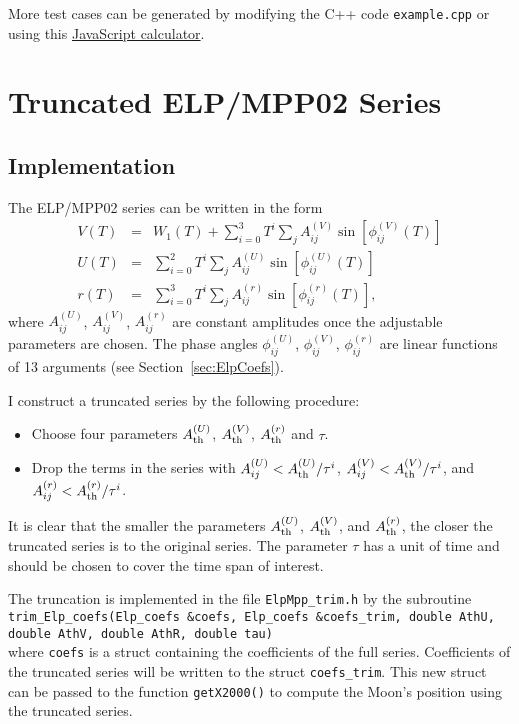 \documentclass[12pt]{article}
\newcommand \beqn {\begin{eqnarray}}
\newcommand \eeqn {\end{eqnarray}}
\begin{document}
More test cases can be generated by modifying the C++ code {\tt example.cpp} or using 
this \href{https://github.com/ytliu0/ElpMpp02/ElpMpp02.html}{JavaScript calculator}.

\section{Truncated ELP/MPP02 Series}

\subsection{Implementation}

The ELP/MPP02 series can be written in the form 
\beqn
V(T) &=& W_1(T) + \sum_{i=0}^3 T^i \sum_j A^{(V)}_{ij} \sin\left[ \phi^{(V)}_{ij}(T)\right] \\
  U(T) &=& \sum_{i=0}^2 T^i \sum_j A^{(U)}_{ij} \sin\left[ \phi^{(U)}_{ij}(T)\right] \\
  r(T) &=& \sum_{i=0}^3 T^i \sum_j A^{(r)}_{ij} \sin\left[ \phi^{(r)}_{ij}(T)\right] ,
\label{eq:Dmoon}
\eeqn 
where $A^{(U)}_{ij}$, $A^{(V)}_{ij}$, $A^{(r)}_{ij}$ are constant amplitudes 
once the adjustable parameters are chosen. The phase angles 
$\phi^{(U)}_{ij}$, $\phi^{(V)}_{ij}$, $\phi^{(r)}_{ij}$ are linear functions
of 13 arguments (see Section~\ref{sec:ElpCoefs}). 

I construct a truncated series by the following procedure:

\begin{itemize}
\item Choose four parameters $A^{(U)}_{\rm th}$, $A^{(V)}_{\rm th}$,
$A^{(r)}_{\rm th}$ and $\tau$.

\item Drop the terms in the series with $A^{(U)}_{ij} < A^{(U)}_{\rm th} /\tau^i$,
$A^{(V)}_{ij} < A^{(V)}_{\rm th} /\tau^i$, and
$A^{(r)}_{ij} < A^{(r)}_{\rm th} /\tau^i$.
\end{itemize}

It is clear that the smaller the parameters $A^{(U)}_{\rm th}$, $A^{(V)}_{\rm th}$,
and $A^{(r)}_{\rm th}$, the closer the truncated series is to the original series.
The parameter $\tau$ has a unit of time and should be chosen to cover the time span 
of interest.

The truncation is implemented in the file {\tt ElpMpp\_trim.h} by the subroutine \\
{\tt trim\_Elp\_coefs(Elp\_coefs \&coefs, Elp\_coefs \&coefs\_trim,
                    double AthU, double AthV, double AthR, double tau)} \\
where {\tt coefs} is a struct containing the coefficients of the full series. 
Coefficients of the truncated series will be written to the struct {\tt coefs\_trim}. 
This new struct can be passed to the function {\tt getX2000()} to 
compute the Moon's position using the truncated series.
\end{document}

